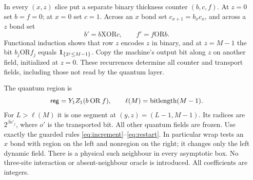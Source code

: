 In every $(x,z)$ slice put a separate binary thickness counter
$(b,c,f)$. At $z=0$ set $b=f=0$; at $x=0$ set $c=1$. Across an
$x$ bond set $c_{x+1}=b_xc_x$, and across a $z$ bond set
\[
 b'=b\mathbin{\mathrm{XOR}}c,\qquad
 f'=f\mathbin{\mathrm{OR}}b.
\]
Functional induction shows that row $z$ encodes $z$ in binary, and at
$z=M-1$ the bit $b_j\mathbin{\mathrm{OR}}f_j$ equals
$\mathbf 1_{\{2^j\leq M-1\}}$. Copy the machine's output bit along $z$
on another field, initialized at $z=0$. These recurrences determine
all counter and transport fields, including those not read by the
quantum layer.

The quantum region is
\[
 \mathsf{reg}=Y_1Z_1(b\mathbin{\mathrm{OR}}f),\qquad
 \ell(M)=\operatorname{bitlength}(M-1).
\]
For $L>\ell(M)$ it is one segment at $(y,z)=(L-1,M-1)$.
Its radices are $2^{\beta o'_j}$, where $o'$ is the transported bit.
All other quantum fields are frozen. Use exactly the guarded rules
\eqref{eq:increment}--\eqref{eq:restart}. In particular wrap tests an
$x$ bond with region on the left and nonregion on the right; it changes
only the left dynamic field. There is a physical such neighbour in
every asymptotic box. No three-site interaction or absent-neighbour
oracle is introduced. All coefficients are integers.

